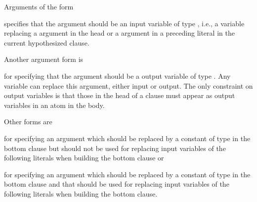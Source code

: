 \documentclass[letterpaper,10pt,english]{sphinxmanual}
\begin{document}
Arguments of the form

\begin{sphinxVerbatim}[commandchars=\\\{\}]
\end{sphinxVerbatim}

specifies that the argument should be an input variable of type , i.e., a variable replacing a  argument in the head or a  argument in a preceding literal in the current hypothesized clause.

Another argument form is

\begin{sphinxVerbatim}[commandchars=\\\{\}]
\end{sphinxVerbatim}

for specifying that the argument should be a output variable of type .
Any variable can replace this argument, either input or output.
The only constraint on output variables is that those in the head of a clause must appear as output variables in an atom in the body.

Other forms are

\begin{sphinxVerbatim}[commandchars=\\\{\}]
\end{sphinxVerbatim}

for specifying an argument which should be replaced by a constant of type  in the bottom clause but should not be used for replacing input variables of the following literals when building the bottom clause or

\begin{sphinxVerbatim}[commandchars=\\\{\}]
\end{sphinxVerbatim}

for specifying an argument which should be replaced by a constant of type  in the bottom clause and that should be used for replacing input variables of the following literals when building the bottom clause.
\end{document}
